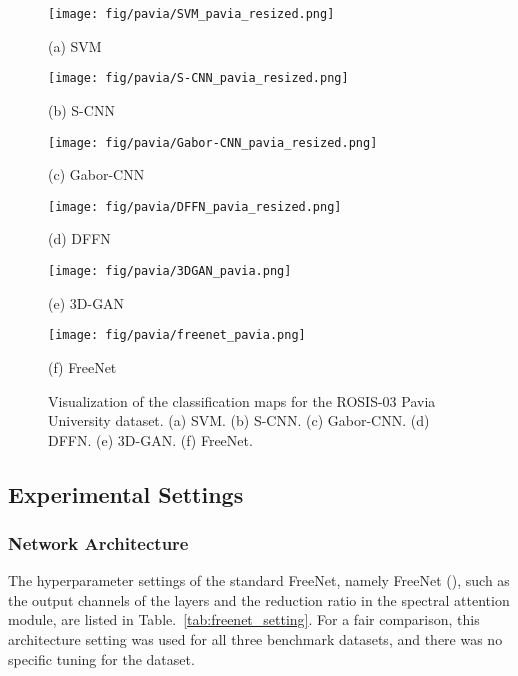 \documentclass[journal]{IEEEtran}
\begin{document}
\begin{figure*}[htb]
  \begin{minipage}[b]{0.15\linewidth}
    \centering
    \texttt{[image: fig/pavia/SVM\_pavia\_resized.png]}
    \centerline{(a) SVM}
  \end{minipage}
  \hfill
  \hspace{4pt}
  \begin{minipage}[b]{0.15\linewidth}
    \centering
    \texttt{[image: fig/pavia/S-CNN\_pavia\_resized.png]}
    \centerline{(b) S-CNN}
  \end{minipage}
  \hfill
  \hspace{4pt}
  \begin{minipage}[b]{0.15\linewidth}
    \centering
    \texttt{[image: fig/pavia/Gabor-CNN\_pavia\_resized.png]}
    \centerline{(c) Gabor-CNN}
  \end{minipage}
  \hfill
  \hspace{4pt}
  \begin{minipage}[b]{0.15\linewidth}
    \centering
    \texttt{[image: fig/pavia/DFFN\_pavia\_resized.png]}
    \centerline{(d) DFFN}
  \end{minipage}
  \hfill
  \hspace{4pt}
  \begin{minipage}[b]{0.15\linewidth}
    \centering
    \texttt{[image: fig/pavia/3DGAN\_pavia.png]}
    \centerline{(e) 3D-GAN}
  \end{minipage}
  \hfill
  \hspace{4pt}
  \begin{minipage}[b]{0.15\linewidth}
    \centering
    \texttt{[image: fig/pavia/freenet\_pavia.png]}
    \centerline{(f) FreeNet}
  \end{minipage}
  \caption{Visualization of the classification maps for the ROSIS-03 Pavia University dataset.
    (a) SVM. (b) S-CNN. (c) Gabor-CNN. (d) DFFN. (e) 3D-GAN. (f) FreeNet.}
  \label{fig:vis_pavia}
\end{figure*}

\subsection{Experimental Settings}
\subsubsection{\textbf{Network Architecture}}
The hyperparameter settings of the standard FreeNet, namely FreeNet (), such as the output channels of the layers and the reduction ratio  in the spectral attention module, are listed in Table.~\ref{tab:freenet_setting}.
For a fair comparison, this architecture setting was used for all three benchmark datasets, and there was no specific tuning for the dataset.
\end{document}
